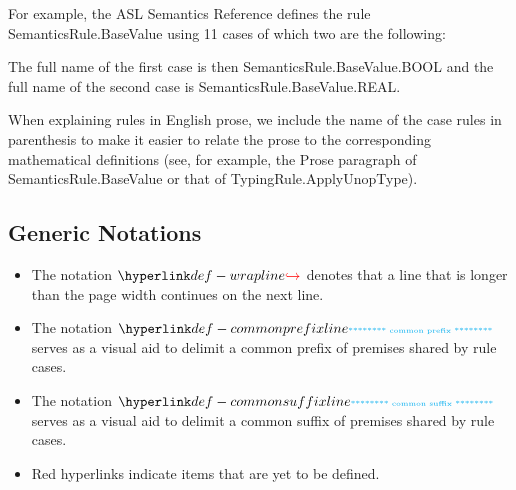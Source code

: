 For example, the ASL Semantics Reference defines the rule SemanticsRule.BaseValue using 11
cases of which two are the following:
The full name of the first case is then SemanticsRule.BaseValue.BOOL
and the full name of the second case is SemanticsRule.BaseValue.REAL.

When explaining rules in English prose, we include the name of the case rules
in parenthesis to make it easier to relate the prose to the corresponding mathematical
definitions (see, for example, the Prose paragraph of SemanticsRule.BaseValue
or that of TypingRule.ApplyUnopType).

\subsection{Generic Notations}
\hypertarget{def-wrapline}{}
\begin{itemize}
\item
The notation $\wrappedline$ denotes that a line that is longer than the page width continues on the next line.

\hypertarget{def-commonprefixline}{}
\item The notation $\commonprefixline$ serves as a visual aid to delimit a common prefix of premises shared by rule cases.

\hypertarget{def-commonsufffixline}{}
\item The notation $\commonsuffixline$ serves as a visual aid to delimit a common suffix of premises shared by rule cases.

\hypertarget{tododefine}{}
\item {} Red hyperlinks indicate items that are yet to be defined.
\end{itemize}

